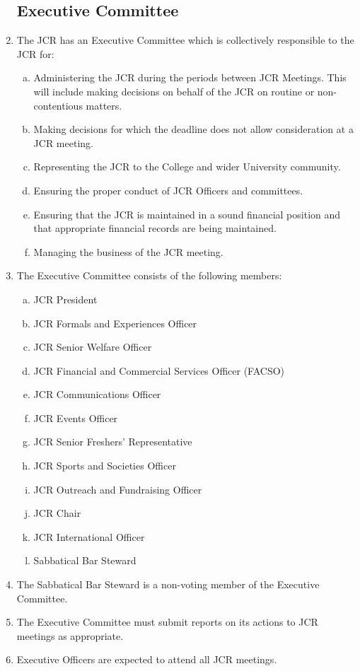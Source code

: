 \documentclass[12pt]{article}
\begin{document}
\begin{enumerate}
    \subsection{Executive Committee}
    \item The JCR has an Executive Committee which is collectively responsible to the JCR for:
    \begin{enumerate}[(a)]
        \item Administering the JCR during the periods between JCR Meetings. This will include making decisions on behalf of the JCR on routine or non-contentious matters.
        \item Making decisions for which the deadline does not allow consideration at a JCR meeting.
        \item Representing the JCR to the College and wider University community.
        \item Ensuring the proper conduct of JCR Officers and committees.
        \item Ensuring that the JCR is maintained in a sound financial position and that appropriate financial records are being maintained.
        \item Managing the business of the JCR meeting.
    \end{enumerate}
    \item The Executive Committee consists of the following members:
    \begin{enumerate}[(a)]
        \item JCR President
        \item JCR Formals and Experiences Officer
        \item JCR Senior Welfare Officer
        \item JCR Financial and Commercial Services Officer (FACSO)
        \item JCR Communications Officer
        \item JCR Events Officer
        \item JCR Senior Freshers' Representative
        \item JCR Sports and Societies Officer
        \item JCR Outreach and Fundraising Officer
        \item JCR Chair
        \item JCR International Officer
        \item Sabbatical Bar Steward
    \end{enumerate}
    \item The Sabbatical Bar Steward is a non-voting member of the Executive Committee.
    \item The Executive Committee must submit reports on its actions to JCR meetings as appropriate.
    \item Executive Officers are expected to attend all JCR meetings.


\end{enumerate}
\end{document}
